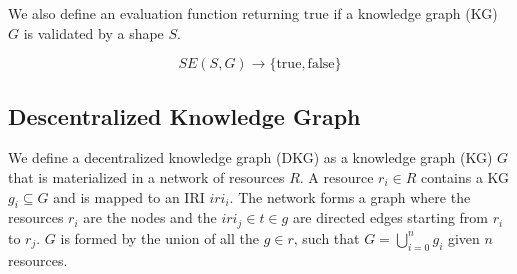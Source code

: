 We also define an evaluation function returning $\mathrm{true}$ if a knowledge graph (KG) $G$ is validated by a shape $S$. 

\begin{equation}
    SE(S, G) \rightarrow \{\mathrm{true}, \mathrm{false}\}
\end{equation}


\subsection{Descentralized Knowledge Graph}
We define a decentralized knowledge graph (DKG) as a knowledge graph (KG) $G$ that is materialized in a network of resources $R$.
A resource $r_i \in R$ contains a KG $g_i \subseteq G$ and is mapped to an IRI $iri_i$.
The network forms a graph where the resources $r_i$ are the nodes and the $iri_j \in t \in g$ are directed edges starting from $r_i$ to $r_j$.
$G$ is formed by the union of all the $g \in r$, such that $G = \bigcup_{i=0}^{n}g_i$ given $n$ resources.